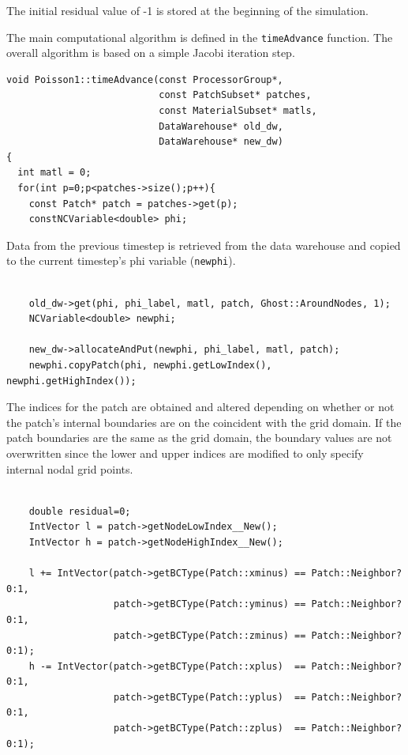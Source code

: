 \documentclass[12pt]{report}
\begin{document}
The initial residual value of -1 is stored at the beginning of the
simulation.

The main computational algorithm is defined in the
\texttt{timeAdvance} function.  The overall algorithm is based on a
simple Jacobi iteration step.

\begin{Verbatim}[fontsize=\footnotesize]
void Poisson1::timeAdvance(const ProcessorGroup*,
                           const PatchSubset* patches,
                           const MaterialSubset* matls,
                           DataWarehouse* old_dw,
                           DataWarehouse* new_dw)
{
  int matl = 0;
  for(int p=0;p<patches->size();p++){
    const Patch* patch = patches->get(p);
    constNCVariable<double> phi;

\end{Verbatim}

Data from the previous timestep is retrieved from the data warehouse
and copied to the current timestep's phi variable (\texttt{newphi}).

\begin{Verbatim}[fontsize=\footnotesize]

    old_dw->get(phi, phi_label, matl, patch, Ghost::AroundNodes, 1);
    NCVariable<double> newphi;

    new_dw->allocateAndPut(newphi, phi_label, matl, patch);
    newphi.copyPatch(phi, newphi.getLowIndex(), newphi.getHighIndex());

\end{Verbatim}

The indices for the patch are obtained and altered depending on
whether or not the patch's internal boundaries are on the coincident
with the grid domain.  If the patch boundaries are the same as the
grid domain, the boundary values are not overwritten since the lower
and upper indices are modified to only specify internal nodal grid
points.



\begin{Verbatim}[fontsize=\footnotesize]

    double residual=0;
    IntVector l = patch->getNodeLowIndex__New();
    IntVector h = patch->getNodeHighIndex__New();

    l += IntVector(patch->getBCType(Patch::xminus) == Patch::Neighbor?0:1,
                   patch->getBCType(Patch::yminus) == Patch::Neighbor?0:1,
                   patch->getBCType(Patch::zminus) == Patch::Neighbor?0:1);
    h -= IntVector(patch->getBCType(Patch::xplus)  == Patch::Neighbor?0:1,
                   patch->getBCType(Patch::yplus)  == Patch::Neighbor?0:1,
                   patch->getBCType(Patch::zplus)  == Patch::Neighbor?0:1);

\end{Verbatim}
\end{document}
